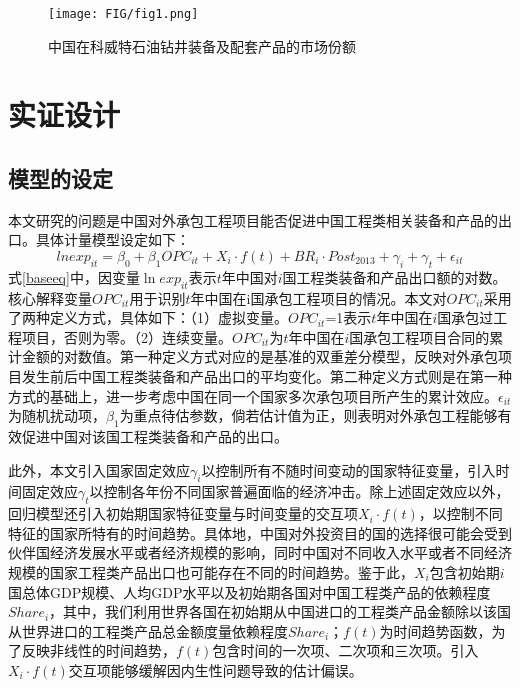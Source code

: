 \documentclass[a4paper,12pt]{article}
\begin{document}
\begin{figure}[htbp]
	\centering
	\texttt{[image: FIG/fig1.png]}
	\captionsetup{labelformat=default,labelsep=period}
	\caption{中国在科威特石油钻井装备及配套产品的市场份额}\label{fig1}
\end{figure} 





\section{实证设计}
\subsection{模型的设定}

本文研究的问题是中国对外承包工程项目能否促进中国工程类相关装备和产品的出口。具体计量模型设定如下：
\begin{equation}\label{baseeq}
	lnexp_{it}=\beta_{0} + \beta_{1}OPC_{it} + X_{i}·f(t)+BR_{i}·Post_{2013}+\gamma_{i} +\gamma_{t}+\epsilon_{it}
\end{equation}
式\ref{baseeq}中，因变量$\ln{{exp}_{it}}$表示$t$年中国对$i$国工程类装备和产品出口额的对数。核心解释变量${OPC}_{it}$用于识别$t$年中国在i国承包工程项目的情况。本文对${OPC}_{it}$采用了两种定义方式，具体如下：（1）虚拟变量。${OPC}_{it}$=1表示$t$年中国在$i$国承包过工程项目，否则为零。（2）连续变量。${OPC}_{it}$为$t$年中国在$i$国承包工程项目合同的累计金额的对数值。第一种定义方式对应的是基准的双重差分模型，反映对外承包项目发生前后中国工程类装备和产品出口的平均变化。第二种定义方式则是在第一种方式的基础上，进一步考虑中国在同一个国家多次承包项目所产生的累计效应。$\epsilon_{it}$为随机扰动项，$\beta_1$为重点待估参数，倘若估计值为正，则表明对外承包工程能够有效促进中国对该国工程类装备和产品的出口。

\vspace{0.5em}  %

此外，本文引入国家固定效应$\gamma_i$以控制所有不随时间变动的国家特征变量，引入时间固定效应$\gamma_t$以控制各年份不同国家普遍面临的经济冲击。除上述固定效应以外，回归模型还引入初始期国家特征变量与时间变量的交互项$X_i·f(t)$，以控制不同特征的国家所特有的时间趋势。具体地，中国对外投资目的国的选择很可能会受到伙伴国经济发展水平或者经济规模的影响，同时中国对不同收入水平或者不同经济规模的国家工程类产品出口也可能存在不同的时间趋势。鉴于此，$X_i$包含初始期$i$国总体GDP规模、人均GDP水平以及初始期各国对中国工程类产品的依赖程度${Share}_i$，其中，我们利用世界各国在初始期从中国进口的工程类产品金额除以该国从世界进口的工程类产品总金额度量依赖程度${Share}_i$；$f(t)$为时间趋势函数，为了反映非线性的时间趋势，$f(t)$包含时间的一次项、二次项和三次项。引入$X_i·f(t)$交互项能够缓解因内生性问题导致的估计偏误。
\end{document}
